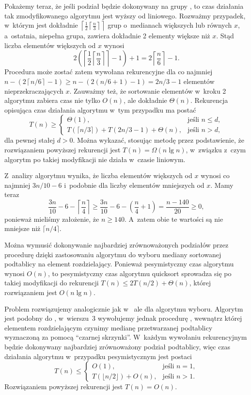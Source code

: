 Pokażemy teraz, że jeśli podział będzie dokonywany na grupy , to czas działania tak zmodyfikowanego algorytmu  jest wyższy od liniowego. Rozważmy przypadek, w~którym jest dokładnie $\left\lceil\frac{1}{2}\left\lceil\frac{n}{3}\right\rceil\right\rceil$ grup o~medianach większych lub równych $x$, a~ostatnia, niepełna grupa, zawiera dokładnie 2 elementy większe niż $x$. Stąd liczba elementów większych od $x$ wynosi
\[
	2\left(\left\lceil\frac{1}{2}\left\lceil\frac{n}{3}\right\rceil\right\rceil-1\right)+1 = 2\left\lceil\frac{n}{6}\right\rceil-1.
\]
Procedura może zostać zatem wywołana rekurencyjne dla co najmniej $n-(2\left\lceil n/6\right\rceil-1)\ge n-(2(n/6+1)-1)=2n/3-1$ elementów nieprzekraczających $x$. Zauważmy też, że sortowanie elementów w~kroku 2 algorytmu  zabiera czas nie tylko $O(n)$, ale dokładnie $\Theta(n)$. Rekurencja opisująca czas działania algorytmu w~tym przypadku ma postać
\[
	T(n) \ge \begin{cases}
		\Theta(1), & \text{jeśli $n\le d$}, \\
		T(\lceil n/3\rceil)+T(2n/3-1)+\Theta(n), & \text{jeśli $n>d$},
	\end{cases}
\]
dla pewnej stałej $d>0$. Można wykazać, stosując metodę przez podstawienie, że rozwiązaniem powyższej rekurencji jest $T(n)=\Omega(n\lg n)$, w~związku z~czym algorytm po takiej modyfikacji nie działa w~czasie liniowym.

\exercise %
Z~analizy algorytmu  wynika, że liczba elementów większych od $x$ wynosi co najmniej $3n/10-6$ i~podobnie dla liczby elementów mniejszych od $x$. Mamy teraz
\[
	\frac{3n}{10}-6-\left\lceil\frac{n}{4}\right\rceil \ge \frac{3n}{10}-6-\left(\frac{n}{4}+1\right) = \frac{n-140}{20} \ge 0,
\]
ponieważ mieliśmy założenie, że $n\ge140$. A~zatem obie te wartości są nie mniejsze niż $\lceil n/4\rceil$.

\exercise %
Można wymusić dokonywanie najbardziej zrównoważonych podziałów przez procedurę  dzięki zastosowaniu algorytmu  do wyboru mediany sortowanej podtablicy na element rozdzielający. Ponieważ pesymistyczny czas algorytmu  wynosi $O(n)$, to pesymistyczny czas algorytmu quicksort sprowadza się po takiej modyfikacji do rekurencji $T(n)\le2T(n/2)+\Theta(n)$, której rozwiązaniem jest $O(n\lg n)$.

\exercise %

\exercise %
Problem rozwiązujemy analogicznie jak w~ ale dla algorytmu wyboru. Algorytm jest podobny do , w~wierszu~3 wywołujemy jednak procedurę , wewnątrz której elementem rozdzielającym czynimy medianę przetwarzanej podtablicy wyznaczoną za pomocą ``czarnej skrzynki''. W~każdym wywołaniu rekurencyjnym będzie dokonywany najbardziej zrównoważony podział podtablicy, więc czas działania algorytmu w~przypadku pesymistycznym jest postaci
\[
	T(n) \le
	\begin{cases}
		O(1), & \text{jeśli $n=1$}, \\
		T(\lfloor n/2\rfloor)+O(n), & \text{jeśli $n>1$}.
	\end{cases}
\]
Rozwiązaniem powyższej rekurencji jest $T(n)=O(n)$.

